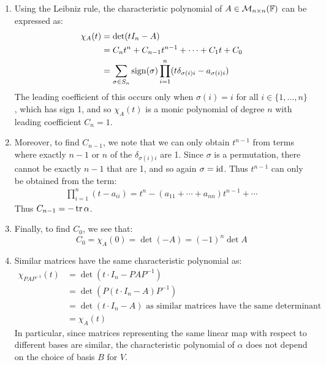 \documentclass[../main.tex]{subfiles}
\begin{document}
\begin{remark}[Remarks]
  \begin{enumerate}
    \item Using the Leibniz rule, the characteristic polynomial of $A \in \mathcal{M}_{n \times n}(\mathbb{F})$ can be expressed as:
      \begin{align*}
        \chi_{A}(t) &= \det (tI_n - A) \\
                    &= C_n t^n + C_{n - 1}t^{n - 1} + \cdots + C_1 t + C_0 \\
                    &= \sum_{\sigma \in S_n} \operatorname{sign}(\sigma) \prod_{i = 1}^{n} (t\delta_{\sigma(i) i} - a_{\sigma(i)i}) \label{leibnizDet}
      \end{align*}
      The leading coefficient of this occurs only when $\sigma(i) = i$ for all $i \in \{1, \ldots, n\}$, which has sign 1, and so $\chi_{A}(t)$ is a monic polynomial of degree $n$ with leading coefficient $C_n = 1$.
    \item Moreover, to find $C_{n - 1}$, we note that we can only obtain $t^{n - 1}$ from terms where exactly $n - 1$ or $n$ of the $\delta_{\sigma(i) i}$ are 1.
      Since $\sigma$ is a permutation, there cannot be exactly $n - 1$ that are 1, and so again $\sigma = \mathrm{id}$.
      Thus $t^{n - 1}$ can only be obtained from the term:
      \begin{align*}
        \prod_{i = 1}^{n} (t - a_{i i}) = t^n - (a_{1 1} + \cdots + a_{n n}) t^{n - 1} + \cdots
      \end{align*}
      Thus $C_{n - 1} = - \operatorname{tr} \alpha$.
    \item Finally, to find $C_0$, we see that:
      \[
        C_0 = \chi_{A}(0) = \det(-A) = (-1)^{n} \det A
      \]
    \item Similar matrices have the same characteristic polynomial as:
      \begin{align*}
        \chi_{P A P^{-1}}(t) &= \det(t \cdot I_n - PAP^{-1}) \\
                             &= \det(P(t \cdot I_n - A)P^{-1}) \\
                             &= \det(t \cdot I_n - A) \text{ as similar matrices have the same determinant} \\
                             &= \chi_A(t)
      \end{align*}
      In particular, since matrices representing the same linear map with respect to different bases are similar, the characteristic polynomial of $\alpha$ does not depend on the choice of basis $B$ for $V$.
  \end{enumerate}
\end{remark}
\end{document}
